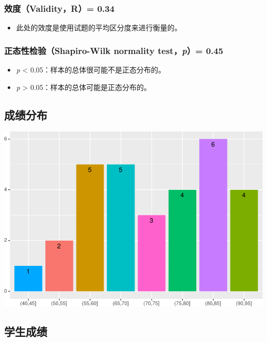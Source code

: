 \documentclass[hyperref,adobefonts]{ctexart}
\providecommand{\tightlist}{\setlength{\itemsep}{0pt}\setlength{\parskip}{0pt}}
\begin{document}
\subsubsection{效度（Validity，R）= 0.34}\label{validityr-0.34}

\begin{itemize}
\tightlist
\item
  此处的效度是使用试题的平均区分度来进行衡量的。
\end{itemize}

\subsubsection{\texorpdfstring{正态性检验（Shapiro-Wilk normality
test，\emph{p}）=
0.45}{正态性检验（Shapiro-Wilk normality test，p）= 0.45}}\label{shapiro-wilk-normality-testp-0.45}

\begin{itemize}
\tightlist
\item
  \emph{p} \textless{} 0.05：样本的总体很可能不是正态分布的。
\item
  \emph{p} \textgreater{} 0.05：样本的总体可能是正态分布的。
\end{itemize}

\subsection{成绩分布}

\includegraphics{ita_files/figure-latex/unnamed-chunk-9-1.pdf}

\subsection{学生成绩}
\end{document}
